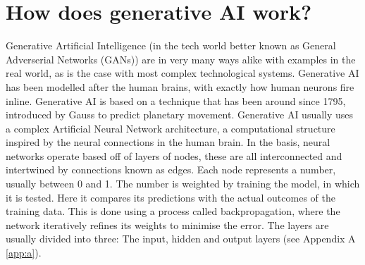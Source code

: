 \documentclass[a4paper,12pt]{report}
\begin{document}
\newpage
\section{How does generative AI work?} \label{sect:work}

\hspace{10mm} Generative Artificial Intelligence (in the tech world better known as General Adverserial Networks (GANs)) are in very many ways alike with examples in the real world, as is the case with most complex technological systems. Generative AI has been modelled after the human brains, with exactly how human neurons fire inline. Generative AI is based on a technique that has been around since 1795, introduced by Gauss to predict planetary movement. Generative AI usually uses a complex Artificial Neural Network architecture, a computational structure inspired by the neural connections in the human brain. In the basis, neural networks operate based off of layers of nodes, these are all interconnected and intertwined by connections known as edges. Each node represents a number, usually between 0 and 1. The number is weighted by training the model, in which it is tested. Here it compares its predictions with the actual outcomes of the training data. This is done using a process called backpropagation, where the network iteratively refines its weights to minimise the error. The layers are usually divided into three: The input, hidden and output layers (see Appendix A \ref{app:a}).
\end{document}
